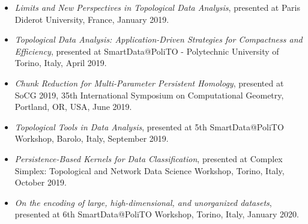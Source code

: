 \documentclass[11pt]{article}
\begin{document}
\begin{itemize}
\item {\em Limits and New Perspectives in Topological Data Analysis}, presented at Paris Diderot University, France, January 2019.

\item {\em Topological Data Analysis: Application-Driven Strategies for Compactness and Efficiency}, presented at SmartData@PoliTO - Polytechnic University of Torino, Italy, April 2019.

\item {\em Chunk Reduction for Multi-Parameter Persistent Homology}, presented at SoCG 2019, 35th International Symposium on Computational Geometry, Portland, OR, USA, June 2019.

\item {\em Topological Tools in Data Analysis}, presented at 5th SmartData@PoliTO Workshop, Barolo, Italy, September 2019.

\item {\em Persistence-Based Kernels for Data Classification}, presented at Complex Simplex: Topological and Network Data Science Workshop, Torino, Italy, October 2019.

\item {\em On the encoding of large, high-dimensional, and unorganized datasets}, presented at 6th SmartData@PoliTO Workshop, Torino, Italy, January 2020.





\end{itemize}
\end{document}
